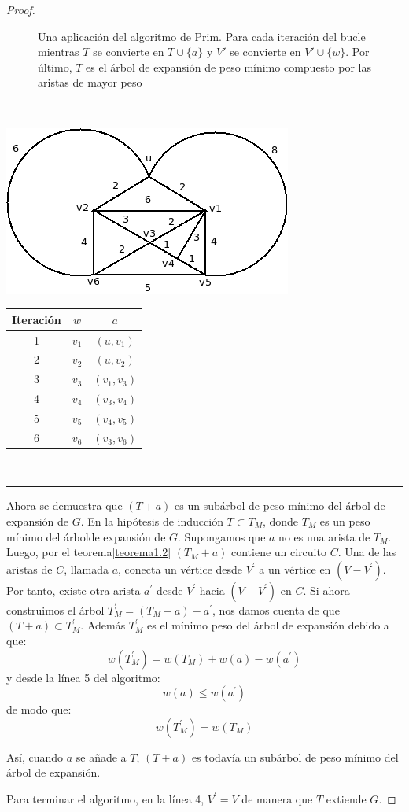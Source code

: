 \documentclass[10pt,a5paper]{book}
\begin{document}
\begin{proof}
\begin{figure}[H]
  \caption{Una aplicación del algoritmo de Prim. Para cada iteración del bucle mientras $T$ se convierte en $T \cup \{a\}$ y $V'$ se convierte en $V' \cup \{w\}$. Por último, $T$ es el árbol de expansión de peso mínimo compuesto por las aristas de mayor peso}
\end{figure}
\hrulefill{}\\
\begin{center}
  \parbox{1cm}
  {
    \includegraphics[scale=0.4]{Figura2_2.png}
  }\hfill
  \parbox{3cm}
  {
    \begin{flushright}
      \begin{tabular}{|c|c|c|}
        \hline
        Iteración & $w$ & $a$\\
        \hline
        1 & $v_1$ & $(u,v_1)$ \\
        \hline
        2 & $v_2$ & $(u,v_2)$ \\
        \hline
        3 & $v_3$ & $(v_1,v_3)$ \\
        \hline
        4 & $v_4$ & $(v_3,v_4)$ \\
        \hline
        5 & $v_5$ & $(v_4,v_5)$ \\
        \hline
        6 & $v_6$ & $(v_3,v_6)$ \\
        \hline
      \end{tabular}
    \end{flushright}
  }\\
\end{center}
\hrule


Ahora se demuestra que $(T + a)$ es un subárbol de peso mínimo del árbol de expansión de $G$. En la hipótesis de inducción $T \subset T_M$, donde $T_M$ es un peso mínimo del árbolde expansión de $G$. Supongamos que $a$ no es una arista de $T_M$. Luego, por el teorema\ref{teorema1.2} $(T_M + a)$ contiene un circuito $C$. Una de las aristas de $C$, llamada $a$, conecta un vértice desde $V^{'}$ a un vértice en $(V - V^{'})$. Por tanto, existe otra arista $a^{'}$ desde $V^{'}$ hacia $(V - V^{'})$ en $C$. Si ahora construimos el árbol $T^{'}_M = (T_M + a) - a^{'}$, nos damos cuenta de que $(T + a) \subset T^{'}_M$. Además $T^{'}_M$ es el mínimo peso del árbol de expansión debido a que:
\[ w(T^{'}_M) = w(T_M) + w(a) - w(a^{'})\]
y desde la línea 5 del algoritmo:
\[ w(a) \le w(a^{'})\]
de modo que:
\[ w(T^{'}_M) = w(T_M) \]

Así, cuando $a$ se añade a $T$, $(T + a)$ es todavía un subárbol de peso mínimo del árbol de expansión.

Para terminar el algoritmo, en la línea 4, $V^{'}=V$ de manera que $T$ extiende  $G$.
\end{proof}
\end{document}

